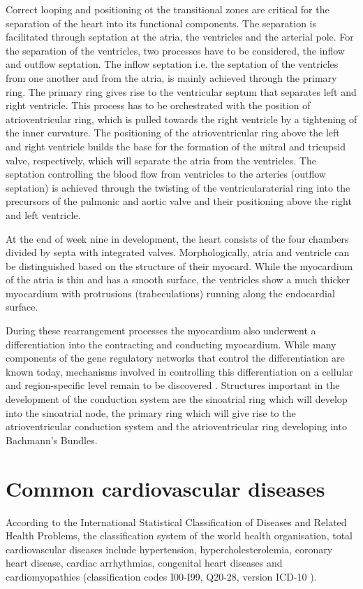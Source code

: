 Correct looping and positioning ot the transitional zones are critical for the separation of the heart into its functional components. The separation is facilitated through septation at the atria, the ventricles and the arterial pole. For the separation of the ventricles, two processes have to be considered, the inflow and outflow septation. The inflow septation i.e. the septation of the ventricles from one another and from the atria, is mainly achieved through the primary ring. The primary ring gives rise to the ventricular septum that separates left and right ventricle. This process has to be orchestrated with the position of atrioventricular ring, which is pulled towards the right ventricle by a tightening of the inner curvature. The positioning of the atrioventricular ring above the left and right ventricle builds the base for the formation of the mitral and tricupsid valve, respectively, which will separate the atria from the ventricles.  The septation controlling the blood flow from ventricles to the arteries (outflow septation) is achieved through the twisting of the ventricularaterial ring into the precursors of the pulmonic and aortic valve and their positioning above the right and left ventricle.  

At the end of week nine in development, the heart consists of the four chambers divided by septa with integrated valves. Morphologically, atria and ventricle can be distinguished based on the structure of their myocard. While the myocardium of the atria is thin and has a smooth surface, the ventricles show a much thicker myocardium with protrusions (trabeculations) running along the endocardial surface. 

During these rearrangement processes the myocardium also underwent a differentiation into the contracting and conducting myocardium. While many components of the gene regulatory networks that control the differentiation are known today,  mechanisms involved in controlling this differentiation on a cellular and region-specific level remain to be discovered \citep{Christoffels2009,Paige2015,Park2017}. Structures important in the development of the conduction system are the sinoatrial ring which will develop into the sinoatrial node, the primary ring which will give rise to the atrioventricular conduction system and the atrioventricular ring developing into Bachmann's Bundles. 

\section{Common cardiovascular diseases}
\label{subsection:CVD}
According to the International Statistical Classification of Diseases and Related Health Problems, the classification system of the world health organisation, total cardiovascular diseases include hypertension, hypercholesterolemia, coronary heart disease, cardiac arrhythmias, congenital heart diseases and cardiomyopathies (classification codes I00-I99, Q20-28, version ICD-10 \citep{WHO2016}). 

